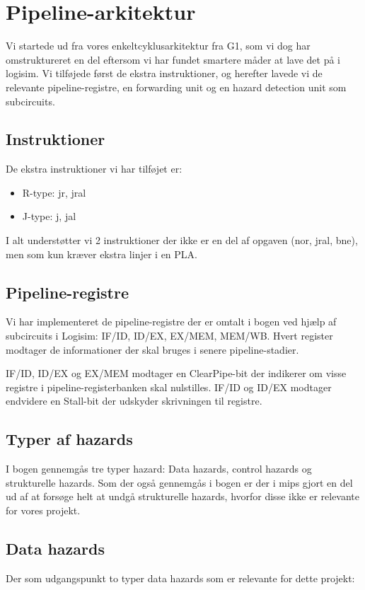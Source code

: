 \section{Pipeline-arkitektur}

Vi startede ud fra vores enkeltcyklusarkitektur fra G1, som vi dog har omstruktureret en del
eftersom vi har fundet smartere måder at lave det på i logisim. Vi tilføjede først de ekstra
instruktioner, og herefter lavede vi de relevante pipeline-registre, en forwarding unit og 
en hazard detection unit som subcircuits.  

\subsection{Instruktioner}
De ekstra instruktioner vi har tilføjet er:
\begin{itemize}
\item R-type: jr, jral
\item J-type: j, jal
\end{itemize}

I alt understøtter vi 2 instruktioner der ikke er en del af opgaven (nor, jral, bne), men som kun kræver ekstra
linjer i en PLA. 

\subsection{Pipeline-registre}

Vi har implementeret de pipeline-registre der er omtalt i bogen ved hjælp af
subcircuits i Logisim: IF/ID, ID/EX, EX/MEM, MEM/WB. Hvert register modtager
de informationer der skal bruges i senere pipeline-stadier.

IF/ID, ID/EX og EX/MEM modtager en ClearPipe-bit der indikerer om visse
registre i pipeline-registerbanken skal nulstilles. IF/ID og ID/EX modtager
endvidere en Stall-bit der udskyder skrivningen til registre.

\subsection{Typer af hazards}
I bogen gennemgås tre typer hazard: Data hazards, control hazards og
strukturelle hazards. Som der også gennemgås i bogen er der i mips gjort en del
ud af at forsøge helt at undgå strukturelle hazards, hvorfor disse ikke er
relevante for vores projekt.

\subsection{Data hazards}
Der som udgangspunkt to typer data hazards som er relevante for dette projekt:

